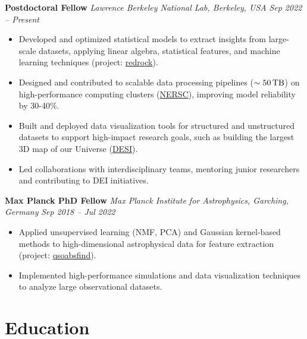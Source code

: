 \documentclass[a4paper,10pt]{article}
\begin{document}
\textbf{Postdoctoral Fellow } \hfill \textit{Lawrence Berkeley National Lab, Berkeley, USA} \hfill \textit{Sep 2022 – Present} 
\begin{itemize}
    \item Developed and optimized statistical models to extract insights from large-scale datasets, applying linear algebra, statistical features, and machine learning techniques (project: \href{https://github.com/desihub/redrock}{redrock}).
    \item Designed and contributed to scalable data processing pipelines ($\sim 50\, \rm TB$) on high-performance computing clusters (\href{https://www.nersc.gov}{NERSC}), improving model reliability by 30-40\%.
    \item Built and deployed data visualization tools for structured and unstructured datasets to support high-impact research goals, such as building the largest 3D map of our Universe (\href{https://en.wikipedia.org/wiki/Dark_Energy_Spectroscopic_Instrument}{DESI}).
    \item Led collaborations with interdisciplinary teams, mentoring junior researchers and contributing to DEI initiatives.
\end{itemize}
\vspace{2mm}
\textbf{Max Planck PhD Fellow} \hfill \textit{Max Planck Institute for Astrophysics, Garching, Germany} \hfill \textit{Sep 2018 – Jul 2022} 
\begin{itemize}
    \item Applied unsupervised learning (NMF, PCA) and Gaussian kernel-based methods to high-dimensional astrophysical data for feature extraction (project: \href{https://github.com/abhi0395/qsoabsfind}{qsoabsfind}).
    \item Implemented high-performance simulations and data visualization techniques to analyze large observational datasets.
\end{itemize}

\vspace{-3mm}
\section*{Education}
\end{document}
